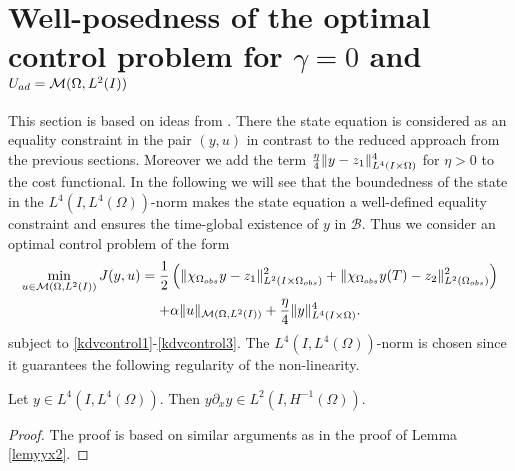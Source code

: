 \section{Well-posedness of the optimal control problem for $\gamma=0$ and $U_{ad}=\mathcal{M}(\Omega, L^{2}(I))$}
\label{wp2}
This section is based on ideas from \cite{lions1985control}. There the state equation is considered as an equality constraint in the pair $(y,u)$ in contrast to the reduced approach from the previous sections. Moreover we add the term $\frac{\eta}{4} \lVert y - z_1\rVert_{L^4(I\times \Omega)}^4$ for $\eta >0$ to the cost functional. In the following we will see that the boundedness of the state in the $L^4(I,L^4(\Omega))$-norm makes the state equation a well-defined equality constraint and ensures the time-global existence of $y$ in $\mathcal B$. Thus we consider an optimal control problem of the form
\begin{multline}
\min_{u \in \mathcal{M}(\Omega, L^{2}(I))}J(y,u)=\frac{1}{2}\left(\lVert\chi_{\Omega_{obs}}y - z_1\rVert_{L^2(I\times \Omega_{obs})}^2+\|\chi_{\Omega_{obs}}y(T)-z_2\|_{L^2(\Omega_{obs})}^2\right) \\+ \alpha \lVert u\rVert_{\mathcal{M}(\Omega, L^{2}(I))} + \frac{\eta}{4} \lVert y\rVert_{L^4(I\times \Omega)}^4.
\label{cost2}
\end{multline}
subject to \eqref{kdvcontrol1}-\eqref{kdvcontrol3}. The $L^4(I,L^4(\Omega))$-norm is chosen since it guarantees the following regularity of the non-linearity.  
\begin{lem}
\label{lemyyxL4}
 Let $y \in L^4(I,L^4(\Omega))$. Then $y \partial_x y \in L^2(I,H^{-1}(\Omega))$.
\end{lem}
\begin{proof}
The proof is based on similar arguments as in the proof of Lemma \ref{lemyyx2}.
\end{proof}
